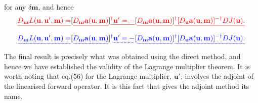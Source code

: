 \documentclass[a4paper,12pt]{paper}
\providecommand{\DIFadd}[1]{{\protect\color{blue}\uwave{#1}}} %
\providecommand{\DIFdel}[1]{{\protect\color{red}\sout{#1}}}                      %
\providecommand{\DIFaddbegin}{} %
\providecommand{\DIFaddend}{} %
\providecommand{\DIFdelbegin}{} %
\providecommand{\DIFdelend}{} %
\begin{document}
for any $\delta \mathbf{m}$, and hence
\DIFdelbegin \begin{displaymath}
\DIFdel{D_{\mathbf{m}}L(\mathbf{u},\mathbf{u}',\mathbf{m})=}[\DIFdel{D_{\mathbf{m}}\mathbf{a}(\mathbf{u},\mathbf{m})}]\DIFdel{^{\dagger}\mathbf{u}'=-}[\DIFdel{D_{\mathbf{m}}\mathbf{a}(\mathbf{u},\mathbf{m})}]\DIFdel{^{\dagger}[D_{\mathbf{u}}\mathbf{a}(\mathbf{u},\mathbf{m})]^{-\dagger}DJ(\mathbf{u}).
}\end{displaymath}%
\DIFdelend \DIFaddbegin \begin{equation}
\DIFadd{D_{\mathbf{m}}L(\mathbf{u},\mathbf{u}',\mathbf{m})=}[\DIFadd{D_{\mathbf{m}}\mathbf{a}(\mathbf{u},\mathbf{m})}]\DIFadd{^{\dagger}\mathbf{u}'=-}[\DIFadd{D_{\mathbf{m}}\mathbf{a}(\mathbf{u},\mathbf{m})}]\DIFadd{^{\dagger}[D_{\mathbf{u}}\mathbf{a}(\mathbf{u},\mathbf{m})]^{-\dagger}DJ(\mathbf{u}).
\label{eq:63}
}\end{equation}\DIFaddend 
The final result is precisely what was obtained using the direct method, and hence we have established the validity of the Lagrange multiplier theorem. It is worth noting that eq.\DIFdelbegin \DIFdel{(56}\DIFdelend \DIFaddbegin \DIFadd{~(\ref{eq:60}}\DIFaddend ) for the Lagrange multiplier, $\mathbf{u}'$, involves the adjoint of the linearised forward operator. It is this fact that gives the adjoint method its name.
\end{document}
